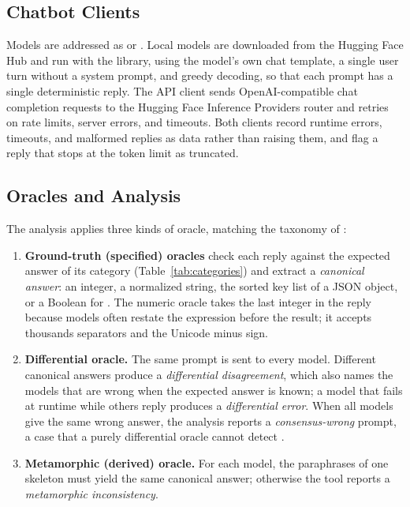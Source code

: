 \subsection{Chatbot Clients}

Models are addressed as  or . Local models are downloaded from the Hugging Face Hub and run with the  library, using the model's own chat template, a single user turn without a system prompt, and greedy decoding, so that each prompt has a single deterministic reply. The API client sends OpenAI-compatible chat completion requests to the Hugging Face Inference Providers router and retries on rate limits, server errors, and timeouts. Both clients record runtime errors, timeouts, and malformed replies as data rather than raising them, and flag a reply that stops at the token limit as truncated.

\subsection{Oracles and Analysis}

The analysis applies three kinds of oracle, matching the taxonomy of \citet{barr2015oracle}:
\begin{enumerate}
  \item \textbf{Ground-truth (specified) oracles} check each reply against the expected answer of its category (Table~\ref{tab:categories}) and extract a \emph{canonical answer}: an integer, a normalized string, the sorted key list of a JSON object, or a Boolean for . The numeric oracle takes the last integer in the reply because models often restate the expression before the result; it accepts thousands separators and the Unicode minus sign.
  \item \textbf{Differential oracle.} The same prompt is sent to every model. Different canonical answers produce a \emph{differential disagreement}, which also names the models that are wrong when the expected answer is known; a model that fails at runtime while others reply produces a \emph{differential error}. When all models give the same wrong answer, the analysis reports a \emph{consensus-wrong} prompt, a case that a purely differential oracle cannot detect \citep{zhang2023sac3}.
  \item \textbf{Metamorphic (derived) oracle.} For each model, the paraphrases of one skeleton must yield the same canonical answer; otherwise the tool reports a \emph{metamorphic inconsistency}.
\end{enumerate}

